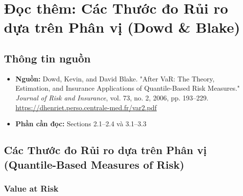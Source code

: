 \chapter{Đọc thêm: Các Thước đo Rủi ro dựa trên Phân vị (Dowd \& Blake)}
\label{ch:M3L2-reading2}


\section{Thông tin nguồn}

\begin{itemize}
  \item \textbf{Nguồn:} Dowd, Kevin, and David Blake. "After VaR: The Theory, Estimation, and Insurance Applications of Quantile-Based Risk Measures." \emph{Journal of Risk and Insurance}, vol. 73, no. 2, 2006, pp. 193--229. \url{https://dhenriet.perso.centrale-med.fr/var2.pdf}
  \item \textbf{Phần cần đọc:} Sections 2.1--2.4 và 3.1--3.3
\end{itemize}

\section{Các Thước đo Rủi ro dựa trên Phân vị (Quantile-Based Measures of Risk)}

\subsection{Value at Risk}

